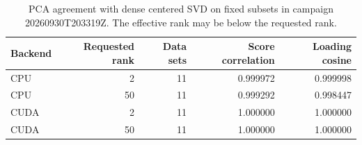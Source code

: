 \begin{table}[htbp]
\centering
\caption{PCA agreement with dense centered SVD on fixed subsets in campaign 20260930T203319Z. The effective rank may be below the requested rank.}
\label{tab:diagnostic-pca-accuracy}
\scriptsize
\begin{tabular}{lrrrr}
\toprule
Backend & Requested rank & Data sets & Score correlation & Loading cosine \\
\midrule
CPU & 2 & 11 & 0.999972 & 0.999998 \\
CPU & 50 & 11 & 0.999292 & 0.998447 \\
CUDA & 2 & 11 & 1.000000 & 1.000000 \\
CUDA & 50 & 11 & 1.000000 & 1.000000 \\
\bottomrule
\end{tabular}
\end{table}
